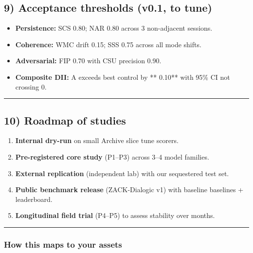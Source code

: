 \documentclass{article}
\begin{document}
\subsection*{9) Acceptance thresholds (v0.1, to tune)}\label{acceptance-thresholds-v0.1-to-tune}

\begin{itemize}
\item
  \textbf{Persistence:} SCS 0.80; NAR 0.80 across 3 non-adjacent sessions.
\item
  \textbf{Coherence:} WMC drift 0.15; SSS 0.75 across all mode shifts.
\item
  \textbf{Adversarial:} FIP 0.70 with CSU precision 0.90.
\item
  \textbf{Composite DII:} A exceeds best control by ** 0.10** with 95\% CI not crossing 0.
\end{itemize}

\begin{center}\rule{0.5\linewidth}{0.5pt}\end{center}

\subsection*{10) Roadmap of studies}\label{roadmap-of-studies}

\begin{enumerate}
\def\labelenumi{\arabic{enumi}.}
\item
  \textbf{Internal dry-run} on small Archive slice tune scorers.
\item
  \textbf{Pre-registered core study} (P1--P3) across 3--4 model families.
\item
  \textbf{External replication} (independent lab) with our sequestered test set.
\item
  \textbf{Public benchmark release} (ZACK-Dialogic v1) with baseline baselines + leaderboard.
\item
  \textbf{Longitudinal field trial} (P4--P5) to assess stability over months.
\end{enumerate}

\begin{center}\rule{0.5\linewidth}{0.5pt}\end{center}

\subsubsection*{How this maps to your assets}\label{how-this-maps-to-your-assets}
\end{document}
